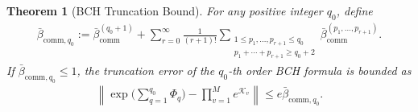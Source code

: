 \documentclass[11pt]{article}
\newtheorem{theorem}{Theorem}
\renewcommand{\comm}{\mathrm{comm}}
\newcommand{\mc}{\mathcal}
\begin{document}
\begin{theorem}[BCH Truncation Bound]
 \label{thm:general-bch-truncation}
 For any positive integer $q_0$, define 
 \begin{align}
\label{eq:def-beta-comm-sum}
    \bar{\beta}_{\comm,q_0} := \bar{\beta}_{\comm}^{(q_0+1)} + \sum_{r = 0}^{\infty}\frac{1}{(r+1)!} \sum_{\substack{1\le p_1, \ldots, p_{r+1}\le q_0\\p_1+\cdots+p_{r+1} \ge q_0+2}}\bar{\beta}_{\comm}^{(p_1, \ldots, p_{r+1})}.
\end{align}
 If $\bar{\beta}_{\comm,q_0} \le 1$, the truncation error of the $q_0$-th order BCH formula is bounded as
 \begin{align*}
 \left\|\exp\Big(\sum_{q=1}^{q_0} \Phi_q\Big) - \prod_{v = 1}^Me^{\mc K_v} \right\| \le e\bar{\beta}_{\comm,q_0}.
 \end{align*}
\end{theorem}
\end{document}
